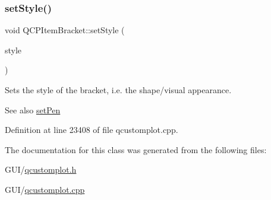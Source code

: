 \subsubsection{\texorpdfstring{set\+Style()}{setStyle()}}
{\footnotesize\ttfamily void Q\+C\+P\+Item\+Bracket\+::set\+Style (\begin{DoxyParamCaption}\item[{\hyperlink{class_q_c_p_item_bracket_a7ac3afd0b24a607054e7212047d59dbd}{Q\+C\+P\+Item\+Bracket\+::\+Bracket\+Style}}]{style }\end{DoxyParamCaption})}

Sets the style of the bracket, i.\+e. the shape/visual appearance.

\begin{DoxySeeAlso}{See also}
\hyperlink{class_q_c_p_item_bracket_ab13001d9cc5d8f9e56ea15bdda682acb}{set\+Pen} 
\end{DoxySeeAlso}


Definition at line 23408 of file qcustomplot.\+cpp.



The documentation for this class was generated from the following files\+:\begin{DoxyCompactItemize}
\item 
G\+U\+I/\hyperlink{qcustomplot_8h}{qcustomplot.\+h}\item 
G\+U\+I/\hyperlink{qcustomplot_8cpp}{qcustomplot.\+cpp}\end{DoxyCompactItemize}
